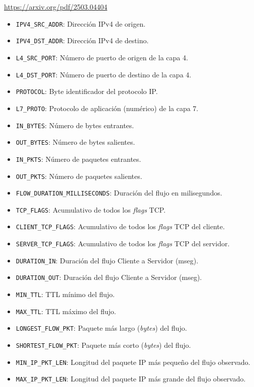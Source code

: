 \url{https://arxiv.org/pdf/2503.04404}

\begin{itemize}
    \item \texttt{IPV4\_SRC\_ADDR}: Dirección IPv4 de origen.
    \item \texttt{IPV4\_DST\_ADDR}: Dirección IPv4 de destino.
    \item \texttt{L4\_SRC\_PORT}: Número de puerto de origen de la capa 4.
    \item \texttt{L4\_DST\_PORT}: Número de puerto de destino de la capa 4.
    \item \texttt{PROTOCOL}: Byte identificador del protocolo IP.
    \item \texttt{L7\_PROTO}: Protocolo de aplicación (numérico) de la capa 7.
    \item \texttt{IN\_BYTES}: Número de bytes entrantes.
    \item \texttt{OUT\_BYTES}: Número de bytes salientes.
    \item \texttt{IN\_PKTS}: Número de paquetes entrantes.
    \item \texttt{OUT\_PKTS}: Número de paquetes salientes.
    \item \texttt{FLOW\_DURATION\_MILLISECONDS}: Duración del flujo en milisegundos.
    \item \texttt{TCP\_FLAGS}: Acumulativo de todos los \textit{flags} TCP.
    \item \texttt{CLIENT\_TCP\_FLAGS}: Acumulativo de todos los \textit{flags} TCP del cliente.
    \item \texttt{SERVER\_TCP\_FLAGS}: Acumulativo de todos los \textit{flags} TCP del servidor.
    \item \texttt{DURATION\_IN}: Duración del flujo Cliente a Servidor (mseg).
    \item \texttt{DURATION\_OUT}: Duración del flujo Cliente a Servidor (mseg).
    \item \texttt{MIN\_TTL}: TTL mínimo del flujo.
    \item \texttt{MAX\_TTL}: TTL máximo del flujo.
    \item \texttt{LONGEST\_FLOW\_PKT}: Paquete más largo (\textit{bytes}) del flujo.
    \item \texttt{SHORTEST\_FLOW\_PKT}: Paquete más corto (\textit{bytes}) del flujo.
    \item \texttt{MIN\_IP\_PKT\_LEN}: Longitud del paquete IP más pequeño del flujo observado.
    \item \texttt{MAX\_IP\_PKT\_LEN}: Longitud del paquete IP más grande del flujo observado.

\end{itemize}
